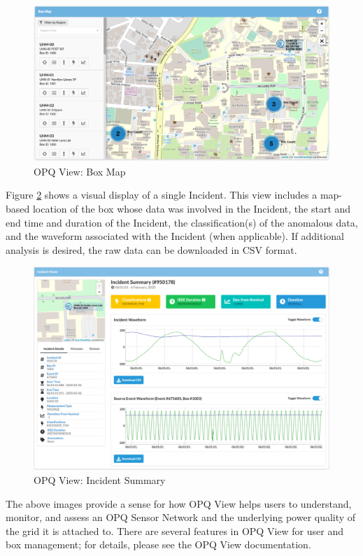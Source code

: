 \begin{figure}
\center \includegraphics[width=5in]{images/view/boxmap-2.png}
\caption{OPQ View: Box Map}
\label{fig:opq-view-box-map}
\end{figure}

Figure \ref{fig:opq-view-incident-summary} shows a visual display of a single Incident. This view includes a map-based location of the box whose data was involved in the Incident, the start and end time and duration of the Incident, the classification(s) of the anomalous data, and the waveform associated with the Incident (when applicable). If additional analysis is desired, the raw data can be downloaded in CSV format.

\begin{figure}
\center \includegraphics[width=5in]{images/view/incident-summary.png}
\caption{OPQ View: Incident Summary}
\label{fig:opq-view-incident-summary}
\end{figure}

The above images provide a sense for how OPQ View helps users to understand, monitor, and assess an OPQ Sensor Network and the underlying power quality of the grid it is attached to. There are several features in OPQ View for user and box management; for details, please see the OPQ View documentation.

